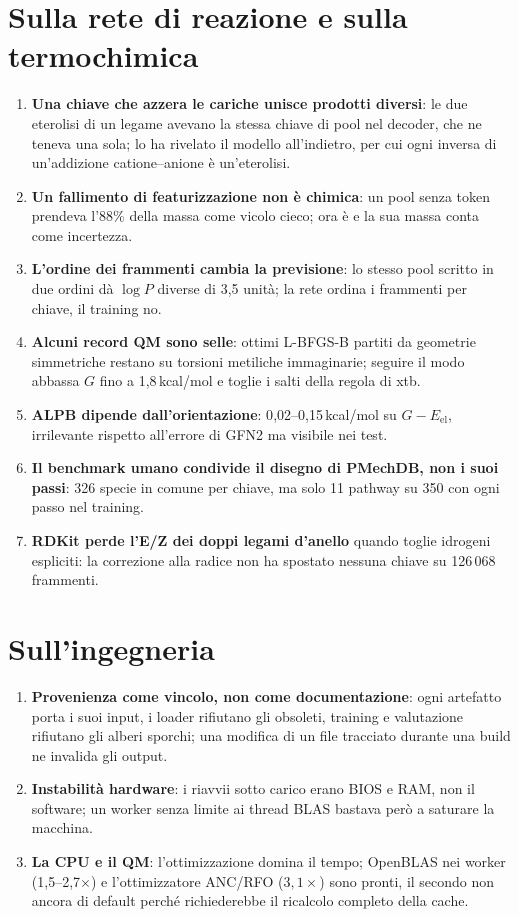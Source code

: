 \documentclass[11pt,a4paper]{report}
\newcommand{\code}[1]{\texttt{\detokenize{#1}}}
\begin{document}
\section{Sulla rete di reazione e sulla termochimica}
\begin{enumerate}[resume]
\item \textbf{Una chiave che azzera le cariche unisce prodotti diversi}: le due eterolisi di un legame
  avevano la stessa chiave di pool nel decoder, che ne teneva una sola; lo ha rivelato il modello
  all'indietro, per cui ogni inversa di un'addizione catione--anione è un'eterolisi.
\item \textbf{Un fallimento di featurizzazione non è chimica}: un pool senza token prendeva l'88\% della
  massa come vicolo cieco; ora è \code{EXPAND_FAILED} e la sua massa conta come incertezza.
\item \textbf{L'ordine dei frammenti cambia la previsione}: lo stesso pool scritto in due ordini dà
  $\log P$ diverse di 3{,}5 unità; la rete ordina i frammenti per chiave, il training no.
\item \textbf{Alcuni record QM sono selle}: ottimi L-BFGS-B partiti da geometrie simmetriche restano su
  torsioni metiliche immaginarie; seguire il modo abbassa $G$ fino a 1{,}8\,kcal/mol e toglie i salti della
  regola di xtb.
\item \textbf{ALPB dipende dall'orientazione}: 0{,}02--0{,}15\,kcal/mol su $G-E_{\mathrm{el}}$, irrilevante
  rispetto all'errore di GFN2 ma visibile nei test.
\item \textbf{Il benchmark umano condivide il disegno di PMechDB, non i suoi passi}: 326 specie in comune
  per chiave, ma solo 11 pathway su 350 con ogni passo nel training.
\item \textbf{RDKit perde l'E/Z dei doppi legami d'anello} quando toglie idrogeni espliciti: la correzione
  alla radice non ha spostato nessuna chiave su 126\,068 frammenti.
\end{enumerate}

\section{Sull'ingegneria}
\begin{enumerate}[resume]
\item \textbf{Provenienza come vincolo, non come documentazione}: ogni artefatto porta i suoi input, i
  loader rifiutano gli obsoleti, training e valutazione rifiutano gli alberi sporchi; una modifica di un
  file tracciato durante una build ne invalida gli output.
\item \textbf{Instabilità hardware}: i riavvii sotto carico erano BIOS e RAM, non il software; un
  worker senza limite ai thread BLAS bastava però a saturare la macchina.
\item \textbf{La CPU e il QM}: l'ottimizzazione domina il tempo; OpenBLAS nei worker (1{,}5--2{,}7$\times$)
  e l'ottimizzatore ANC/RFO ($3{,}1\times$) sono pronti, il secondo non ancora di default perché
  richiederebbe il ricalcolo completo della cache.
\end{enumerate}
\end{document}
